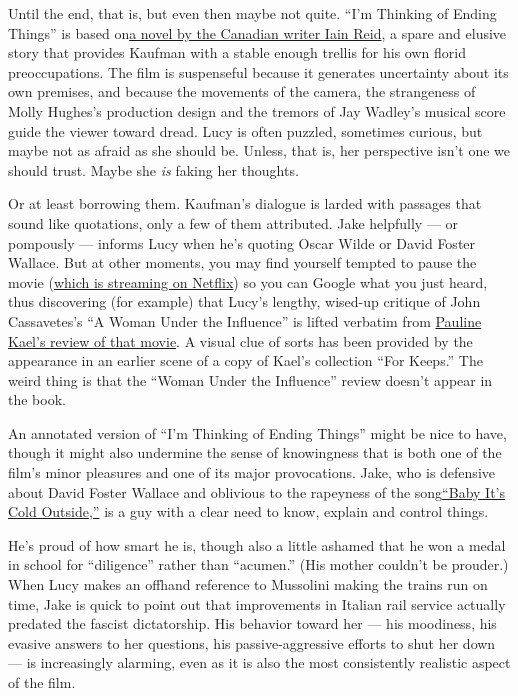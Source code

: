 Until the end, that is, but even then maybe not quite. ``I'm Thinking of
Ending Things'' is based
on\href{https://www.nytimes3xbfgragh.onion/2016/09/04/books/review/im-thinking-of-ending-things-iain-reid.html}{a
novel by the Canadian writer Iain Reid}, a spare and elusive story that
provides Kaufman with a stable enough trellis for his own florid
preoccupations. The film is suspenseful because it generates uncertainty
about its own premises, and because the movements of the camera, the
strangeness of Molly Hughes's production design and the tremors of Jay
Wadley's musical score guide the viewer toward dread. Lucy is often
puzzled, sometimes curious, but maybe not as afraid as she should be.
Unless, that is, her perspective isn't one we should trust. Maybe she
\emph{is} faking her thoughts.

Or at least borrowing them. Kaufman's dialogue is larded with passages
that sound like quotations, only a few of them attributed. Jake
helpfully --- or pompously --- informs Lucy when he's quoting Oscar
Wilde or David Foster Wallace. But at other moments, you may find
yourself tempted to pause the movie
(\href{https://www.netflix.com/title/80211559}{which is streaming on
Netflix}) so you can Google what you just heard, thus discovering (for
example) that Lucy's lengthy, wised-up critique of John Cassavetes's ``A
Woman Under the Influence'' is lifted verbatim from
\href{https://archives.newyorker.com/newyorker/1974-12-09/flipbook/178/}{Pauline
Kael's review of that movie}. A visual clue of sorts has been provided
by the appearance in an earlier scene of a copy of Kael's collection
``For Keeps.'' The weird thing is that the ``Woman Under the Influence''
review doesn't appear in the book.

An annotated version of ``I'm Thinking of Ending Things'' might be nice
to have, though it might also undermine the sense of knowingness that is
both one of the film's minor pleasures and one of its major
provocations. Jake, who is defensive about David Foster Wallace and
oblivious to the rapeyness of the
song\href{https://www.vox.com/identities/2016/12/19/13885552/baby-its-cold-outside-feminist-date-rape-romantic}{``Baby
It's Cold Outside,''} is a guy with a clear need to know, explain and
control things.

He's proud of how smart he is, though also a little ashamed that he won
a medal in school for ``diligence'' rather than ``acumen.'' (His mother
couldn't be prouder.) When Lucy makes an offhand reference to Mussolini
making the trains run on time, Jake is quick to point out that
improvements in Italian rail service actually predated the fascist
dictatorship. His behavior toward her --- his moodiness, his evasive
answers to her questions, his passive-aggressive efforts to shut her
down --- is increasingly alarming, even as it is also the most
consistently realistic aspect of the film.

